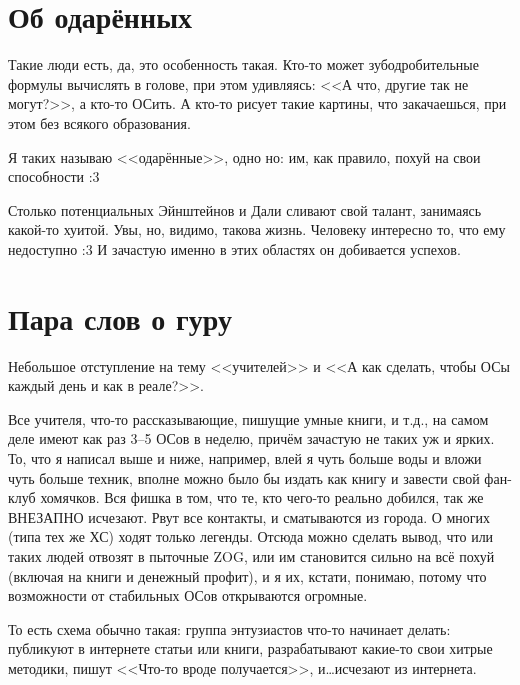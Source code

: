 \documentclass[a4paper,14pt,oneside]{memoir}
\begin{document}
\clearpage


\section{Об одарённых}

\medskip
Такие люди есть, да, это особенность такая. Кто-то может зубодробительные формулы вычислять в голове, при этом удивляясь: <<А что, другие так не могут?>>, а кто-то ОСить. 
А кто-то рисует такие картины, что закачаешься, при этом без всякого образования. 

Я таких называю <<одарённые>>, одно но: им, как правило, похуй на свои способности :3
 
Столько потенциальных Эйнштейнов и Дали сливают свой талант, занимаясь какой-то хуитой. Увы, но, видимо, такова жизнь. Человеку интересно то, что ему недоступно :3 И зачастую именно в этих областях он добивается успехов.




\section{Пара слов о гуру}
Небольшое отступление на тему <<учителей>> и <<А как сделать, чтобы ОСы каждый день и как в реале?>>.

Все учителя, что-то рассказывающие, пишущие умные книги, и т.д., на самом деле имеют как раз 3--5 ОСов в неделю, причём зачастую не таких уж и ярких. То, что я написал выше и ниже, например, влей я чуть больше воды и вложи чуть больше техник, вполне можно было бы издать как книгу и завести свой фан-клуб хомячков. Вся фишка в том, что те, кто чего-то реально добился, так же ВНЕЗАПНО исчезают. Рвут все контакты, и сматываются из города. О многих (типа тех же ХС) ходят только легенды. Отсюда можно сделать вывод, что или таких людей отвозят в пыточные ZOG, или им становится сильно на всё похуй (включая на книги и денежный профит), и я их, кстати, понимаю, потому что возможности от стабильных ОСов открываются огромные.

То есть схема обычно такая: группа энтузиастов что-то начинает делать: публикуют в интернете статьи или книги, разрабатывают какие-то свои хитрые методики, пишут <<Что-то вроде получается>>, и\ldots исчезают из интернета.
\end{document}
